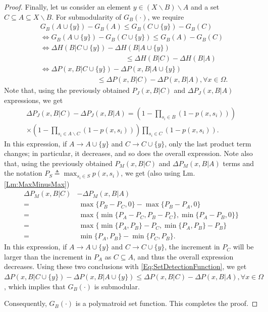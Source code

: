 \documentclass[letterpaper, 10 pt, conference]{ieeeconf}
\begin{document}
\begin{proof}
Finally, let us consider an element $y\in (X\backslash B)\backslash A$ and a set $C \subseteq A \subseteq X\backslash B$. For submodularity of $G_B(\cdot)$, we require 
\begin{align*}
&G_B(A\cup\{y\})-G_B(A) \leq G_B(C\cup\{y\})-G_B(C)\\
&\iff G_B(A\cup\{y\})-G_B(C\cup\{y\}) \leq G_B(A)-G_B(C)\\
&\iff \Delta H (B \vert C\cup\{y\}) - \Delta H (B \vert A\cup\{y\}) \\
&\quad\quad\quad\quad \quad\quad\quad\quad \quad\quad\quad\quad
\leq \Delta H (B \vert C) - \Delta H (B \vert A)\\
&\iff \Delta P(x,B\vert C\cup\{y\}) - \Delta P(x, B \vert A \cup \{y\}) \\
&\quad\quad\quad\quad \quad\quad\quad\quad 
\leq \Delta P(x,B\vert C) - \Delta P(x, B \vert A), \forall x\in\Omega.
\end{align*}
Note that, using the previously obtained $P_J(x,B\vert C)$ and $\Delta P_J(x,B\vert A)$ expressions, we get 
\begin{align*}
\Delta P_J(x,B\vert C)-\Delta P_J(x,B\vert A) = 
(1-\prod_{s_i\in B}(1-p(x,s_i)))\\
\times (1-\prod_{s_i\in A \backslash C} (1-p(x,s_i)))\prod_{s_i\in C} (1-p(x,s_i)).
\end{align*}
In this expression, if $A\rightarrow A\cup\{y\}$ and $C \rightarrow C \cup\{y\}$, only the last product term changes; in particular, it decreases, and so does the overall expression.
Note also that, using the previously obtained $P_M(x,B\vert C)$ and $\Delta P_M(x,B\vert A)$ terms and the notation $P_S \triangleq \max_{s_i\in S} p(x,s_i)$, we get (also using Lm. \ref{Lm:MaxMinusMax})
\begin{align*}
\Delta P_M(x,B\vert C) &- \Delta P_M(x,B\vert A) \\
=&\ \max\{P_B-P_C,0\}-\max\{P_B-P_A,0\}\\
=&\  \max\{\min\{P_A-P_C,P_B-P_C\},\min\{P_A-P_B,0\}\}\\
=&\ \max\{\min\{P_A,P_B\}-P_C,\min\{P_A,P_B\}-P_B\}\\
=&\ \min\{P_A,P_B\} - \min\{P_C,P_B\}.
\end{align*}
In this expression, if $A\rightarrow A\cup\{y\}$ and $C \rightarrow C \cup\{y\}$, the increment in $P_C$ will be larger than the increment in $P_A$ as $C \subseteq A$, and thus the overall expression decreases. 
Using these two conclusions with \eqref{Eq:SetDetectionFunction}, we get 
$\Delta P(x,B\vert C\cup\{y\}) - \Delta P(x, B \vert A \cup \{y\}) \leq \Delta P(x,B\vert C) - \Delta P(x, B \vert A), \forall x\in\Omega$, which implies that $G_B(\cdot)$ is submodular. 

Consequently, $G_B(\cdot)$ is a polymatroid set function. This completes the proof.
\end{proof}
\end{document}
